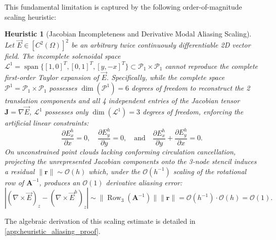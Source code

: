 \documentclass[preprint,12pt]{elsarticle}
\newtheorem{heuristic}{Heuristic}
\begin{document}
This fundamental limitation is captured by the following order-of-magnitude scaling heuristic:

\begin{heuristic}[Jacobian Incompleteness and Derivative Modal Aliasing Scaling]
    \label{heur:L1_aliasing}
    Let $\vec{E} \in [C^2(\Omega)]^2$ be an arbitrary twice continuously differentiable 2D vector field. The incomplete solenoidal space $\mathcal{L}^1 = \operatorname{span}\{[1, 0]^T, [0, 1]^T, [y, -x]^T\} \subset \mathcal{P}_1 \times \mathcal{P}_1$ cannot reproduce the complete first-order Taylor expansion of $\vec{E}$. Specifically, while the complete space $\mathcal{P}^1 = \mathcal{P}_1 \times \mathcal{P}_1$ possesses $\dim(\mathcal{P}^1) = 6$ degrees of freedom to reconstruct the 2 translation components and all 4 independent entries of the Jacobian tensor $\mathbf{J} = \nabla\vec{E}$, $\mathcal{L}^1$ possesses only $\dim(\mathcal{L}^1) = 3$ degrees of freedom, enforcing the artificial linear constraints:
    \begin{equation}
        \frac{\partial E_x^h}{\partial x} = 0, \quad \frac{\partial E_y^h}{\partial y} = 0, \quad \text{and} \quad \frac{\partial E_x^h}{\partial y} + \frac{\partial E_y^h}{\partial x} = 0.
        \label{eq:L1_derivative_constraints}
    \end{equation}
    On unconstrained point clouds lacking conforming circulation cancellation, projecting the unrepresented Jacobian components onto the 3-node stencil induces a residual $\|\mathbf{r}\| \sim \mathcal{O}(h)$ which, under the $\mathcal{O}(h^{-1})$ scaling of the rotational row of $\mathbf{A}^{-1}$, produces an $\mathcal{O}(1)$ derivative aliasing error:
    \begin{equation}
        |(\nabla \times \vec{E})_z - (\nabla \times \vec{E}^h)_z| \sim \|\operatorname{Row}_3(\mathbf{A}^{-1})\| \|\mathbf{r}\| = \mathcal{O}(h^{-1}) \cdot \mathcal{O}(h) = \mathcal{O}(1).
        \label{eq:aliasing_order_proof}
    \end{equation}
\end{heuristic}

The algebraic derivation of this scaling estimate is detailed in \ref{app:heuristic_aliasing_proof}.
\end{document}
